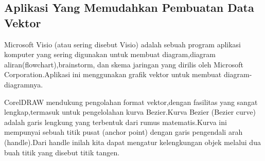 \subsection { Aplikasi Yang Memudahkan Pembuatan Data Vektor}
Microsoft Visio (atau sering disebut Visio) adalah sebuah program aplikasi komputer yang sering digunakan untuk membuat diagram,diagram aliran(flowchart),brainstorm, dan skema jaringan yang dirilis oleh Microsoft Corporation.Aplikasi ini menggunakan grafik vektor untuk membuat diagram-diagramnya.

CorelDRAW mendukung pengolahan format vektor,dengan fasilitas yang sangat lengkap,termasuk untuk pengelolahan kurva Bezier.Kurva Bezier (Bezier curve) adalah garis lengkung yang terbentuk dari rumus matematis.Kurva ini mempunyai sebuah titik pusat (anchor point) dengan garis pengendali arah (handle).Dari handle inilah kita dapat mengatur kelengkungan objek melalui dua buah titik yang disebut titik tangen.

